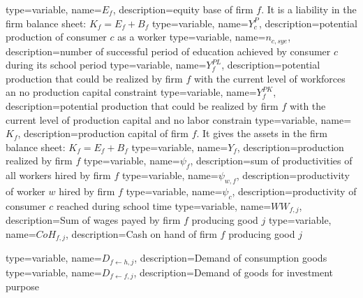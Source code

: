 {%
  type=variable,%
  name={$E_{f}$},%
  description={equity base of firm $f$. It is a liability in the firm balance sheet: $K_f=E_f+B_f$} 
}
{%
  type=variable,%
  name={$Y^{P}_{c}$},%
  description={potential production of consumer $c$ as a worker} 
}
{%
  type=variable,%
  name={$n_{c,sye}$},%
  description={number of successful period of education achieved by consumer $c$ during its school period} 
}
{%
  type=variable,%
  name={$Y^{PL}_{f}$},%
  description={potential production that could be realized by firm $f$ with the current level of workforces an no production capital constraint} 
}
{%
  type=variable,%
  name={$Y^{PK}_{f}$},%
  description={potential production that could be realized by firm $f$ with the current level of production capital and no labor constrain} 
}
{%
  type=variable,%
  name={$K_{f}$},%
  description={production capital of firm $f$. It gives the assets in the firm balance sheet: $K_f=E_f+B_f$} 
}
{%
  type=variable,%
  name={$Y_{f}$},%
  description={production realized by firm $f$} 
}
{%
  type=variable,%
  name={$\psi_{f}$},%
  description={sum of productivities of all workers hired by firm $f$} 
}
{%
  type=variable,%
  name={$\psi_{w,f}$},%
  description={productivity of worker $w$ hired by firm $f$} 
}
{%
  type=variable,%
  name={$\psi_{c}$},%
  description={productivity of consumer $c$ reached during school time} 
}
{%
  type=variable,%
  name={$WW_{f,j}$},%
  description={Sum of wages payed by firm $f$ producing good $j$} 
}
{%
  type=variable,%
  name={$CoH_{f,j}$},%
  description={Cash on hand of firm $f$ producing good $j$} 
}

{%
  type=variable,%
  name={$D_{f\leftarrow h,j}$},%
  description={Demand of consumption goods} 
}
{%
  type=variable,%
  name={$D_{f\leftarrow f,j}$},%
  description={Demand of goods for investment purpose} 
}
